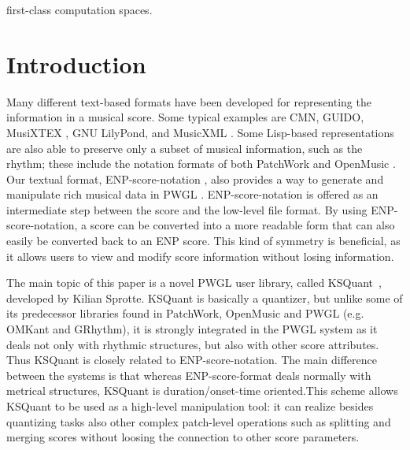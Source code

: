 \documentclass[runningheads,a4paper]{llncs}
\begin{document}
first-class computation spaces\cite{Engines:97}.


\section{Introduction}\label{old:sec:introduction}
Many different text-based formats have been developed for representing
the information in a musical score. Some typical examples are CMN,
GUIDO, MusiXTEX \cite{agon}, GNU LilyPond\cite{agon}, and
MusicXML \cite{agon}. Some Lisp-based representations are also
able to preserve only a subset of musical information, such as the
rhythm; these include the notation formats of both PatchWork \cite{agon}
and OpenMusic \cite{agon}. Our textual format, ENP-score-notation
\cite{agon}, also provides a way to generate and manipulate rich
musical data in PWGL \cite{agon}.  ENP-score-notation is offered as an
intermediate step between the score and the low-level file format. By
using ENP-score-notation, a score can be converted into a more
readable form that can also easily be converted back to an ENP
score. This kind of symmetry is beneficial, as it allows users to view
and modify score information without losing information.

The main topic of this paper is a novel PWGL user library, called
KSQuant~\cite{agon}, developed by Kilian Sprotte. KSQuant is
basically a quantizer, but unlike some of its predecessor libraries
found in PatchWork, OpenMusic and PWGL (e.g. OMKant and GRhythm), it
is strongly integrated in the PWGL system as it deals not only with
rhythmic structures, but also with other score attributes. Thus
KSQuant is closely related to ENP-score-notation. The main difference
between the systems is that whereas ENP-score-format deals normally
with metrical structures, KSQuant is duration/onset-time oriented.This
scheme allows KSQuant to be used as a high-level manipulation tool: it
can realize besides quantizing tasks also other complex patch-level
operations such as splitting and merging scores without loosing the
connection to other score parameters.
\end{document}

